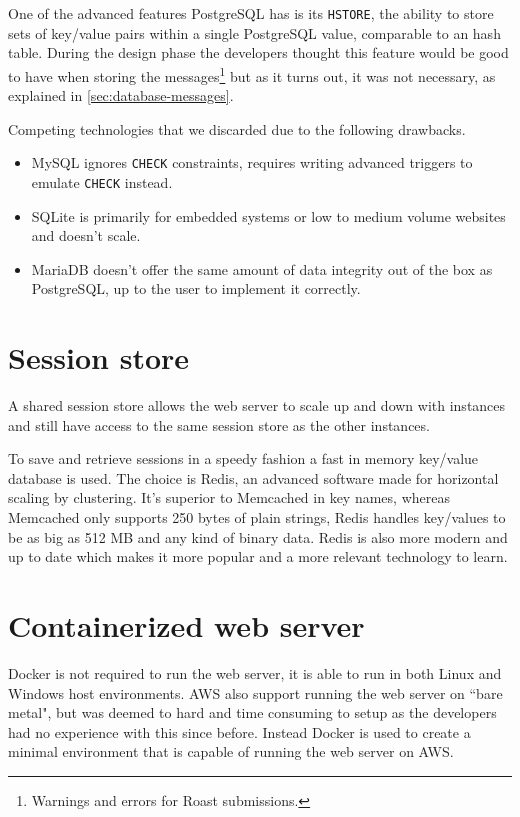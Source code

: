 \documentclass[12pt,a4paper]{report}
\begin{document}
One of the advanced features PostgreSQL has is its \texttt{HSTORE}, the ability to store sets of key/value pairs within a single PostgreSQL value\cite{pg-hstore}, comparable to an hash table. During the design phase the developers thought this feature would be good to have when storing the messages\footnote{Warnings and errors for Roast submissions.} but as it turns out, it was not necessary, as explained in \autoref{sec:database-messages}.

Competing technologies that we discarded due to the following drawbacks.
\begin{itemize}
    \item MySQL ignores \texttt{CHECK} constraints\cite{mysql-check-constraint}, requires writing advanced triggers to emulate \texttt{CHECK} instead\cite{mysql-emulate-check}.
    \item SQLite is primarily for embedded systems or low to medium volume websites and doesn't scale\cite{sqlite-when-to-use}.
    \item MariaDB doesn't offer the same amount of data integrity out of the box as \\ PostgreSQL\cite{mariadb-data-integrity}, up to the user to implement it correctly.
\end{itemize}

\section{Session store}
A shared session store allows the web server to scale up and down with instances and still have access to the same session store as the other instances.

To save and retrieve sessions in a speedy fashion a fast in memory key/value database is used. The choice is Redis, an advanced software made for horizontal scaling by clustering. It's superior to Memcached in key names, whereas Memcached only supports 250 bytes of plain strings\cite{memcache-key-size}, Redis handles key/values to be as big as 512 MB\cite{redis-key-size} and any kind of binary data. Redis is also more modern and up to date which makes it more popular and a more relevant technology to learn\cite{key-value-comparison}\cite{redis-vs-memcached}.

\section{Containerized web server}
Docker\cite{why-docker} is not required to run the web server, it is able to run in both Linux and Windows host environments. AWS also support running the web server on ``bare metal", but was deemed to hard and time consuming to setup as the developers had no experience with this since before. Instead Docker is used to create a minimal environment that is capable of running the web server on AWS.
\end{document}
